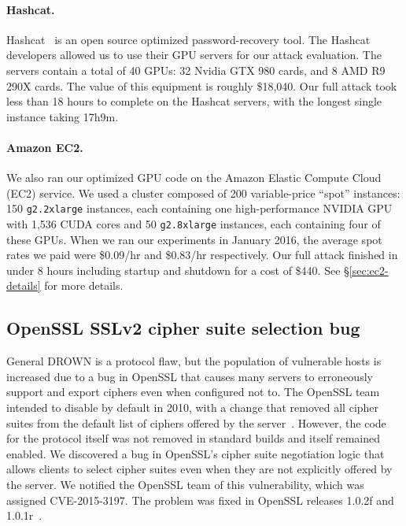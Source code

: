 \paragraph{Hashcat.}
Hashcat~\cite{hashcat} is an open source optimized password-recovery tool.
The Hashcat developers allowed us to use their GPU servers for our attack evaluation. 
The servers contain a total of 40 GPUs: 32 Nvidia GTX 980 cards, and 8 AMD R9 290X cards.
The value of this equipment is roughly \$18,040.
Our full attack took less than 18 hours to complete on the Hashcat servers, with the longest single instance taking 17h9m.


\paragraph{Amazon EC2.}
\label{sec:ec2_results}
\ifext

\else
We also ran our optimized GPU code on the Amazon Elastic Compute Cloud (EC2) service.  We used a cluster composed of 200 variable-price ``spot'' instances: 150 \texttt{g2.2xlarge} instances, each containing one high-performance NVIDIA GPU with 1,536 CUDA cores and 50 \texttt{g2.8xlarge} instances, each containing four of these GPUs.  
When we ran our experiments in January 2016, the average spot rates we paid were \$0.09/hr and \$0.83/hr respectively.  
Our full attack finished in under 8 hours including startup and shutdown for a cost of \$440.  
\ifext See \S\ref{sec:ec2-details} for more details. \fi
\fi

\subsection{OpenSSL SSLv2 cipher suite selection bug}

General DROWN is a protocol flaw, but the population of vulnerable hosts is
increased due to a bug in OpenSSL that causes many servers to erroneously
support \ssltwo and export ciphers even when configured not to. The OpenSSL
team intended to disable \ssltwo by default in 2010, with a change that removed
all \ssltwo cipher suites from the default list of ciphers offered by the
server~\cite{openssl-changelog}.  However, the code for the protocol itself was
not removed in standard builds and \ssltwo itself remained enabled. We
discovered a bug in OpenSSL's \ssltwo cipher suite negotiation logic that
allows clients to select \ssltwo cipher suites even when they are not
explicitly offered by the server. We notified the OpenSSL team of this
vulnerability, which was assigned CVE-2015-3197.  The problem was fixed in
OpenSSL releases 1.0.2f and 1.0.1r~\cite{openssl-changelog}.
